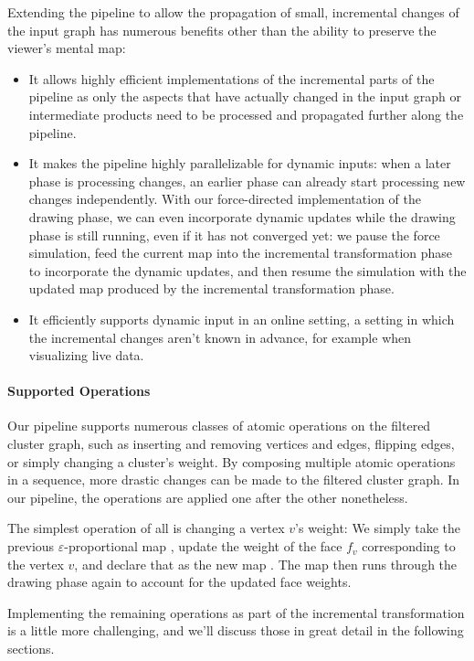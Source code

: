 Extending the pipeline to allow the propagation of small, incremental changes of the input graph has numerous benefits other than the ability to preserve the viewer's mental map:
%
\begin{itemize}
\item It allows highly efficient implementations of the incremental parts of the pipeline as only the aspects that have actually changed in the input graph or intermediate products need to be processed and propagated further along the pipeline.
\item It makes the pipeline highly parallelizable for dynamic inputs: when a later phase is processing changes, an earlier phase can already start processing new changes independently.
With our force-directed implementation of the drawing phase, we can even incorporate dynamic updates while the drawing phase is still running, even if it has not converged yet: we pause the force simulation, feed the current map  into the incremental transformation phase to incorporate the dynamic updates, and then resume the simulation with the updated map  produced by the incremental transformation phase.
\item It efficiently supports dynamic input in an online setting, \ie{} a setting in which the incremental changes aren't known in advance, for example when visualizing live data.
\end{itemize}



\paragraph{Supported Operations}

Our pipeline supports numerous classes of atomic operations on the filtered cluster graph, such as inserting and removing vertices and edges, flipping edges, or simply changing a cluster's weight.
By composing multiple atomic operations in a sequence, more drastic changes can be made to the filtered cluster graph.
In our pipeline, the operations are applied one after the other nonetheless.

The simplest operation of all is changing a vertex $v$'s weight:
We simply take the previous $\varepsilon$-proportional map , update the weight of the face $f_v$ corresponding to the vertex $v$, and declare that as the new map .
The map  then runs through the drawing phase again to account for the updated face weights.

Implementing the remaining operations as part of the incremental transformation is a little more challenging, and we'll discuss those in great detail in the following sections.

\clearpage

\clearpage

\clearpage

